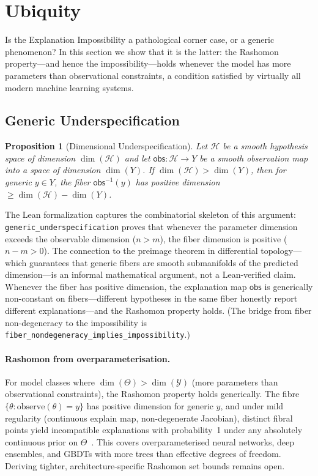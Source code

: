 \documentclass[11pt,a4paper]{article}
\newtheorem{proposition}[theorem]{Proposition}
\newcommand{\sH}{\mathcal{H}}
\begin{document}
\section{Ubiquity}
\label{sec:ubiquity}

Is the Explanation Impossibility a pathological corner case, or a
generic phenomenon?  In this section we show that it is the latter: the
Rashomon property---and hence the impossibility---holds whenever the model
has more parameters than observational constraints, a condition satisfied by
virtually all modern machine learning systems.

\subsection{Generic Underspecification}
\label{sec:generic-underspec}

\begin{proposition}[Dimensional Underspecification]
\label{prop:generic-underspec}
Let $\sH$ be a smooth hypothesis space of dimension $\dim(\sH)$ and let
$\mathsf{obs} : \sH \to Y$ be a smooth observation map into a space of
dimension $\dim(Y)$.  If $\dim(\sH) > \dim(Y)$, then for generic
$y \in Y$, the fiber $\mathsf{obs}^{-1}(y)$ has positive dimension
$\geq \dim(\sH) - \dim(Y)$.
\end{proposition}

\noindent
The Lean formalization captures the combinatorial skeleton of this argument: \texttt{generic\_underspecification} proves that whenever the parameter dimension exceeds the observable dimension ($n > m$), the fiber dimension is positive ($n - m > 0$). The connection to the preimage theorem in differential topology---which guarantees that generic fibers are smooth submanifolds of the predicted dimension---is an informal mathematical argument, not a Lean-verified claim.
Whenever the fiber has positive dimension, the explanation map
$\mathsf{obs}$ is generically non-constant on fibers---different hypotheses
in the same fiber honestly report different explanations---and the Rashomon
property holds.  (The bridge from fiber non-degeneracy to the
impossibility is \texttt{fiber\_nondegeneracy\_implies\_impossibility}.)

\paragraph{Rashomon from overparameterisation.}
For model classes where $\dim(\Theta) > \dim(\mathcal{Y})$ (more parameters than observational constraints), the Rashomon property holds generically. The fibre $\{\theta : \text{observe}(\theta) = y\}$ has positive dimension for generic $y$, and under mild regularity (continuous explain map, non-degenerate Jacobian), distinct fibral points yield incompatible explanations with probability~1 under any absolutely continuous prior on $\Theta$~\citep{damour2022underspecification}. This covers overparameterised neural networks, deep ensembles, and GBDTs with more trees than effective degrees of freedom. Deriving tighter, architecture-specific Rashomon set bounds remains open.
\end{document}
